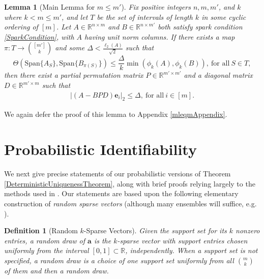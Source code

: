 \documentclass[journal, onecolumn]{IEEEtran}
\newtheorem{lemma}{Lemma}
\newtheorem{definition}{Definition}
\begin{document}
\begin{lemma}[Main Lemma for $m \leq m'$]\label{MainLemma2}
Fix positive integers $n, m, m'$, and $k$ where $k < m \leq m'$, and let $T$ be the set of intervals of length $k$ in some cyclic ordering of $[m]$. Let $A \in \mathbb{R}^{n \times m}$ and $B \in \mathbb{R}^{n \times m'}$ both satisfy spark condition \eqref{SparkCondition}, with $A$ having unit norm columns. If there exists a map $\pi: T \to {[m'] \choose k}$ and some $\Delta < \frac{\ell_{2}(A)}{\sqrt{2}}$ such that 
\begin{equation}\label{GapUpperBound2}
\Theta(\text{Span}\{A_{S}\}, \text{Span}\{B_{\pi(S)}\}) \leq \frac{ \Delta }{k} \min(\phi_k(A), \phi_k(B)), \ \text{for all} \ S \in T,
\end{equation}
%
then there exist a partial permutation matrix $P \in \mathbb{R}^{m' \times m'}$ and a diagonal matrix $D \in \mathbb{R}^{m' \times m}$ such that
\begin{align}
|(A - BPD)\mathbf{e}_i|_2 \leq \Delta, \ \text{for all} \ i \in [m].
\end{align}
\end{lemma}

We again defer the proof of this lemma to Appendix \ref{mleqmAppendix}.



\section{Probabilistic Identifiability}\label{PUT}

We next give precise statements of our probabilistic versions of Theorem \ref{DeterministicUniquenessTheorem}, along with brief proofs relying largely to the methods used in \cite{Hillar15}. Our statements are based upon the following elementary construction of \emph{random sparse vectors} (although many ensembles will suffice, e.g. \cite[\S 4]{baraniuk2008simple}).

\begin{definition}[Random $k$-Sparse Vectors]\label{RandomDraw}
Given the support set for its $k$ nonzero entries, a random draw of $\mathbf{a}$ is the $k$-sparse vector with support entries chosen uniformly from the interval $[0, 1] \subset \mathbb{R}$, independently. When a support set is not specified, a random draw is a choice of one support set uniformly from all ${m \choose k}$ of them and then a random draw.
\end{definition}
\end{document}
